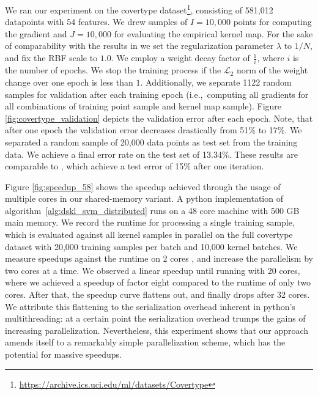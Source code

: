 \documentclass{article} %
\newcommand{\sebastian}[1]{\textcolor{red}{{\bf Sebastian:} #1}}
\begin{document}
We ran our experiment on the covertype dataset\footnote{\url{https://archive.ics.uci.edu/ml/datasets/Covertype}}, consisting of 581,012 datapoints with 54 features. We drew samples of $I=10,000$ points for computing the gradient and $J=10,000$ for evaluating the empirical kernel map. For the sake of comparability with the results in \cite{Dai2014} we set the regularization parameter $\lambda$ to $1 / N$, and fix the RBF scale to $1.0$. We employ a weight decay factor of $\frac{1}{i}$, where $i$ is the number of epochs. We stop the training process if the $\mathcal{L}_{2}$ norm of the weight change over one epoch is less than $1$. Additionally, we separate 1122 random samples for validation after each training epoch (i.e.,~computing all gradients for all combinations of training point sample and kernel map sample).
Figure \ref{fig:covertype_validation} depicts the validation error after each epoch. Note, that after one epoch the validation error decreases drastically from 51\% to 17\%. We separated a random sample of 20,000 data points as test set from the training data. We achieve a final error rate on the test set of 13.34\%. 
These results are comparable to \cite{Dai2014}, which achieve a test error of 15\% after one iteration. 

Figure \ref{fig:speedup_58} shows the speedup achieved through the usage of multiple cores in our shared-memory variant. A python implementation of algorithm~\autoref{alg:dskl_svm_distributed} runs on a 48 core machine with 500 GB main memory. We record the runtime for processing a single training sample, which is evaluated against all kernel samples in parallel on the full covertype dataset with 20,000 training samples per batch and 10,000 kernel batches. We measure speedups against the runtime on 2 cores 
, and increase the parallelism by two cores at a time. We observed a linear speedup until running with 20 cores, where we achieved a speedup of factor eight compared to the runtime of only two cores. After that, the speedup curve flattens out, and finally drops after 32 cores. We attribute this flattening to the serialization overhead inherent in python's multithreading: at a certain point the serialization overhead trumps the gains of increasing parallelization. Nevertheless, this experiment shows that our approach amends itself to a remarkably simple parallelization scheme, which has the potential for massive speedups.
\end{document}
